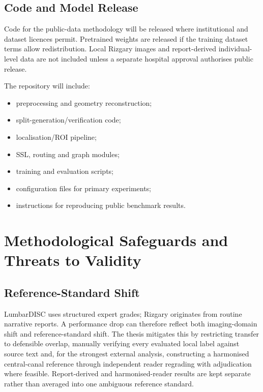 \subsection{Code and Model Release}
\label{sec:method-release}

Code for the public-data methodology will be released where institutional and
dataset licences permit. Pretrained weights are released if the training
dataset terms allow redistribution. Local Rizgary images and report-derived
individual-level data are not included unless a separate hospital approval
authorises public release.

The repository will include:

\begin{itemize}
  \item preprocessing and geometry reconstruction;
  \item split-generation/verification code;
  \item localisation/ROI pipeline;
  \item SSL, routing and graph modules;
  \item training and evaluation scripts;
  \item configuration files for primary experiments;
  \item instructions for reproducing public benchmark results.
\end{itemize}

\section{Methodological Safeguards and Threats to Validity}
\label{sec:method-threats}

\subsection{Reference-Standard Shift}
\label{sec:method-threat-label}

LumbarDISC uses structured expert grades; Rizgary originates from routine
narrative reports. A performance drop can therefore reflect both imaging-domain
shift and reference-standard shift. The thesis mitigates this by restricting
transfer to defensible overlap, manually verifying every evaluated local label
against source text and, for the strongest external analysis, constructing a
harmonised central-canal reference through independent reader regrading with
adjudication where feasible. Report-derived and harmonised-reader results are
kept separate rather than averaged into one ambiguous reference standard.

